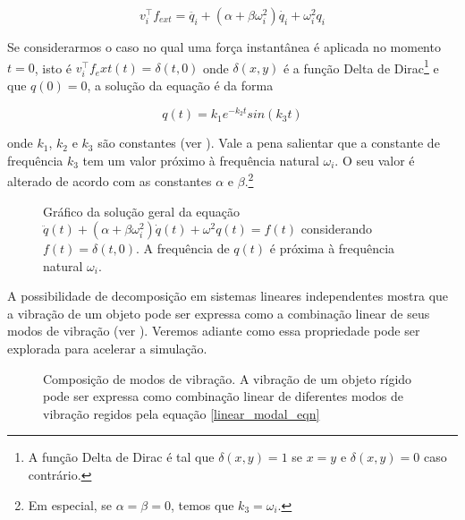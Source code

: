 \begin{equation}
	v_i^\intercal f_{ext} = \ddot{q_i} + (\alpha + \beta\omega_i^2)\dot{q_i} + \omega_i^2q_{i}
	\label{linear_modal_eqn}
\end{equation}

Se considerarmos o caso no qual uma força instantânea é aplicada no momento $t = 0$, isto é $v_i^\intercal f_ext(t) = \delta(t, 0)$ onde $\delta(x, y)$ é a função Delta de Dirac\footnote{A função Delta de Dirac é tal que $\delta(x, y) = 1$ se $x = y$ e $\delta(x, y) = 0$ caso contrário.} e que $q(0) = 0$, a solução da equação é da forma

\begin{equation}
	q(t) = k_1 e^{-k_2t} sin(k_3t)
\end{equation}

onde $k_1$, $k_2$ e $k_3$ são constantes (ver ). Vale a pena salientar que a constante de frequência $k_3$ tem um valor próximo à frequência natural $\omega_i$. O seu valor é alterado de acordo com as constantes $\alpha$ e $\beta$.\footnote{Em especial, se $\alpha = \beta = 0$, temos que $k_3 = \omega_i$.}

\begin{figure}[ht]
	\centering
	
	\caption[Gráfico da solução da equação $\ddot{q}(t) + (\alpha + \beta\omega_i^2)\dot{q}(t) + \omega^2q(t) = f(t)$]{Gráfico da solução geral da equação $\ddot{q}(t) + (\alpha + \beta\omega_i^2)\dot{q}(t) + \omega^2q(t) = f(t)$ considerando $f(t) = \delta(t, 0)$. A frequência de $q(t)$ é próxima à frequência natural $\omega_i$.}\label{wave_mode}
\end{figure}

A possibilidade de decomposição em sistemas lineares independentes mostra que a vibração de um objeto pode ser expressa como a combinação linear de seus modos de vibração (ver ). Veremos adiante como essa propriedade pode ser explorada para acelerar a simulação.

\begin{figure}[ht]
	\centering
	
	\caption[Composição de modos de vibração]{Composição de modos de vibração. A vibração de um objeto rígido pode ser expressa como combinação linear de diferentes modos de vibração regidos pela equação \eqref{linear_modal_eqn}}\label{plate_modes}
\end{figure}




